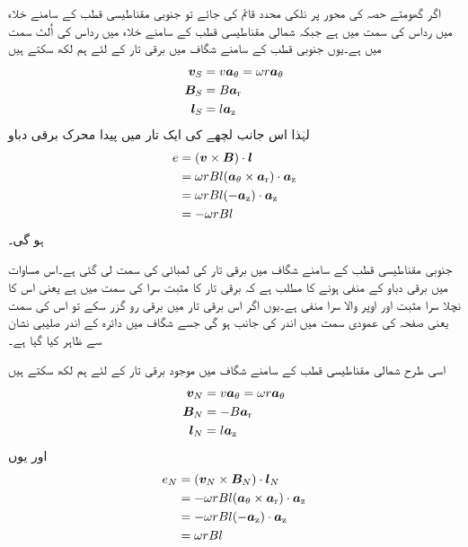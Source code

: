 اگر گھومتے حصہ کی محور پر نلکی محدد قائم کی جائے تو جنوبی مقناطیسی قطب کے سامنے خلاء میں  رداس کی سمت میں ہے جبکہ شمالی مقناطیسی قطب کے سامنے  خلاء میں   رداس کی اُلٹ سمت میں ہے۔یوں جنوبی قطب کے سامنے شگاف میں برقی تار   کے لئے ہم لکھ سکتے ہیں
\begin{gather}
\begin{aligned}
{\ensuremath{{\boldsymbol{v}}}}_S&=v {\boldsymbol{a}}_{\theta} =\omega r {\boldsymbol{a}}_{\theta}\\
{{\boldsymbol{B}}}_S&=B {\boldsymbol{a}}_{\textup{r}}\\
{{\boldsymbol{l}}}_S&=l {\boldsymbol{a}}_{\textup{z}}
\end{aligned}
\end{gather}
لہٰذا اس جانب لچھے کی ایک تار میں پیدا محرک برقی دباو
\begin{gather}
\begin{aligned}
e&=({{\boldsymbol{v}}} \times {\ensuremath{{\boldsymbol{B}}}}) \cdot {\ensuremath{{\boldsymbol{l}}}}\\
&=\omega r B l  ({\boldsymbol{a}}_{\theta} \times {\boldsymbol{a}}_{\textup{r}}) \cdot {\boldsymbol{a}}_{\textup{z}}\\
&=\omega r B l  (-{\boldsymbol{a}}_{\textup{z}}) \cdot {\boldsymbol{a}}_{\textup{z}}\\
&=-\omega r B l 
\end{aligned}
\end{gather}
ہو گی۔

جنوبی مقناطیسی قطب کے سامنے شگاف میں برقی تار کی لمبائی کی سمت  لی گئی ہے۔اس مساوات میں برقی دباو کے منفی ہونے کا مطلب ہے کہ برقی تار کا مثبت سرا  کی سمت میں ہے یعنی اس کا نچلا سرا مثبت اور اوپر والا سرا منفی ہے۔یوں اگر اس برقی تار میں برقی رو گزر سکے تو اس کی سمت  یعنی صفحہ کی عمودی سمت میں اندر کی جانب ہو گی جسے شگاف میں دائرہ کے اندر صلیبی نشان سے ظاہر کیا گیا ہے۔ 

اسی طرح شمالی مقناطیسی قطب کے سامنے شگاف میں موجود برقی تار کے لئے ہم لکھ سکتے ہیں
\begin{gather}
\begin{aligned}
{\ensuremath{{\boldsymbol{v}}}}_N&=v {\boldsymbol{a}}_{\theta}=\omega r {\boldsymbol{a}}_{\theta}\\
{{\boldsymbol{B}}}_N&=-B {\boldsymbol{a}}_{\textup{r}}\\
{{\boldsymbol{l}}}_N&=l {\boldsymbol{a}}_{\textup{z}}
\end{aligned}
\end{gather}
اور یوں 
\begin{gather}
\begin{aligned}
e_N&=({{\boldsymbol{v}}}_N \times {\ensuremath{{\boldsymbol{B}}}}_N)\cdot {\ensuremath{{\boldsymbol{l}}}}_N\\
&=-\omega r B l ({\boldsymbol{a}}_{\theta} \times {\boldsymbol{a}}_{\textup{r}}) \cdot {\boldsymbol{a}}_{\textup{z}}\\
&=-\omega r B l (-{\boldsymbol{a}}_{\textup{z}}) \cdot {\boldsymbol{a}}_{\textup{z}}\\
&=\omega r B l 
\end{aligned}
\end{gather}

